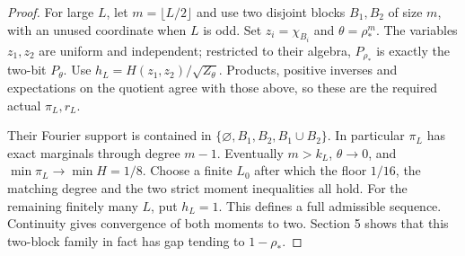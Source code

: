 \documentclass[11pt]{article}
\begin{document}
\begin{proof}
For large $L$, let $m=\lfloor L/2\rfloor$ and use two disjoint blocks $B_1,B_2$ of size $m$, with an unused coordinate when $L$ is odd. Set $z_i=\chi_{B_i}$ and $\theta=\rho_*^m$. The variables $z_1,z_2$ are uniform and independent; restricted to their algebra, $P_{\rho_*}$ is exactly the two-bit $P_\theta$. Use $h_L=H(z_1,z_2)/\sqrt{Z_\theta}$. Products, positive inverses and expectations on the quotient agree with those above, so these are the required actual $\pi_L,r_L$.

Their Fourier support is contained in
$\{\varnothing,B_1,B_2,B_1\cup B_2\}$. In particular $\pi_L$ has exact marginals through degree $m-1$. Eventually $m>k_L$, $\theta\to0$, and $\min\pi_L\to\min H=1/8$. Choose a finite $L_0$ after which the floor $1/16$, the matching degree and the two strict moment inequalities all hold. For the remaining finitely many $L$, put $h_L=1$. This defines a full admissible sequence. Continuity gives convergence of both moments to two. Section 5 shows that this two-block family in fact has gap tending to $1-\rho_*$.
\end{proof}
\end{document}
